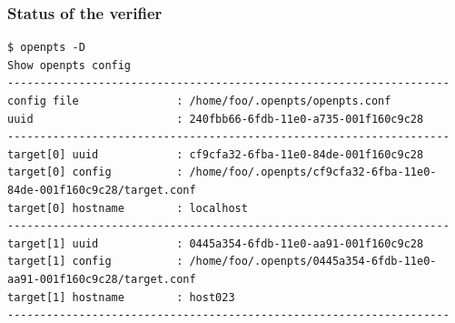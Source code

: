 \subsubsection{Status of the verifier}
\begin{lstlisting}[style=console]
$ openpts -D
Show openpts config
--------------------------------------------------------------------
config file               : /home/foo/.openpts/openpts.conf
uuid                      : 240fbb66-6fdb-11e0-a735-001f160c9c28
--------------------------------------------------------------------
target[0] uuid            : cf9cfa32-6fba-11e0-84de-001f160c9c28
target[0] config          : /home/foo/.openpts/cf9cfa32-6fba-11e0-84de-001f160c9c28/target.conf
target[0] hostname        : localhost
--------------------------------------------------------------------
target[1] uuid            : 0445a354-6fdb-11e0-aa91-001f160c9c28
target[1] config          : /home/foo/.openpts/0445a354-6fdb-11e0-aa91-001f160c9c28/target.conf
target[1] hostname        : host023
--------------------------------------------------------------------
\end{lstlisting}


